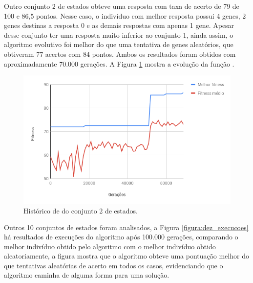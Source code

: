 Outro conjunto 2 de estados obteve uma resposta com taxa de acerto de 79 de 100 e 86,5 pontos. Nesse caso, o indivíduo com melhor resposta possui 4 genes, 2 genes destinas a resposta 0 e as demais respostas com apenas 1 gene. Apesar desse conjunto ter uma resposta muito inferior ao conjunto 1, ainda assim, o algoritmo evolutivo foi melhor do que uma tentativa de genes aleatórios, que obtiveram 77 acertos com 84 pontos. Ambos os resultados foram obtidos com aproximadamente 70.000 gerações. A Figura \ref{figura:resultado_79} mostra a evolução da função \fitness.

\begin{figure}[htb]
    \caption{Histórico de \fitness do conjunto 2 de estados.}
    \label{figura:resultado_79}
    \centering
    \includegraphics[scale=0.8]{images/resultado_79}
    \fautor
\end{figure}

Outros 10 conjuntos de estados foram analisados, a Figura \ref{figura:dez_execucoes} há resultados de execuções do algoritmo após 100.000 gerações, comparando o melhor indivíduo obtido pelo algoritmo com o melhor indivíduo obtido aleatoriamente, a figura mostra que o algoritmo obteve uma pontuação melhor do que tentativas aleatórias de acerto em todos os casos, evidenciando que o algoritmo caminha de alguma forma para uma solução.

